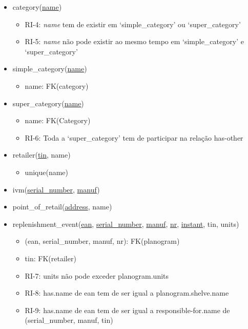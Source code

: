\documentclass{article}
\newcommand{\bpoint}{\item[$\bullet$]}
\newenvironment{myitemize}
{ \begin{itemize}
	\setlength{\itemsep}{5pt}
	\setlength{\parskip}{0pt}
	\setlength{\parsep}{0pt} }
{ \end{itemize}	}
\begin{document}
\begin{myitemize}
		\vspace{2mm}

	 	\item[]{category(\underline{name})}
		\begin{myitemize}
			\bpoint RI-4: \textit{name} tem de existir em `simple\_category' ou `super\_category'
			\bpoint RI-5: \textit{name} não pode existir ao mesmo tempo em `simple\_category' e `super\_category'
		\end{myitemize}

		\vspace{2mm}

	 	\item[] simple\_category(\underline{name})
		\begin{myitemize}
			\bpoint name: FK(category)
		\end{myitemize}

		\vspace{2mm}

	 	\item[] super\_category(\underline{name})
		\begin{myitemize}
			\bpoint name: FK(Category)
			\bpoint RI-6: Toda a `super\_category' tem de participar na relação has-other
		\end{myitemize}

		\vspace{2mm}

	 	\item[] retailer(\underline{tin}, name)
		\begin{myitemize}
			\bpoint unique(name)
		\end{myitemize}

		\vspace{2mm}

		\item[] ivm(\underline{serial\_number}, \underline{manuf})

		\vspace{2mm}

		\item[] point\_of\_retail(\underline{address}, name)

		\vspace{2mm}

	\item[] replenishment\_event(\underline{ean}, \underline{serial\_number}, \underline{manuf}, \underline{nr}, \underline{instant}, tin, units)
		\begin{myitemize}
			\bpoint (ean, serial\_number, manuf, nr): FK(planogram)
			\bpoint tin: FK(retailer)
			\bpoint RI-7: units não pode exceder planogram.units
			\bpoint RI-8: has.name de ean tem de ser igual a planogram.shelve.name
			\bpoint RI-9: has.name de ean tem de ser igual a responsible-for.name de (serial\_number, manuf, tin)


\end{myitemize}
\end{myitemize}
\end{document}

